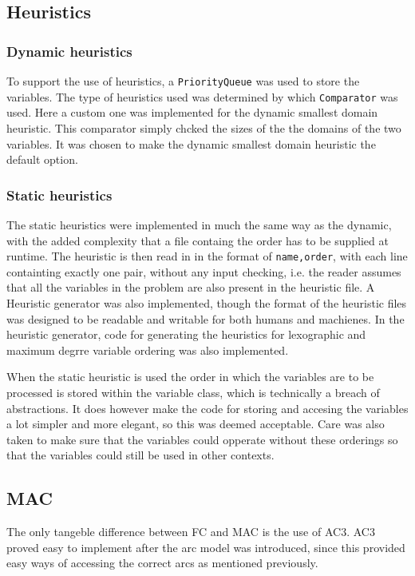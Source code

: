 \documentclass[british]{article}
\newcommand{\code}[1]{\texttt{#1}}
\begin{document}
\subsection{Heuristics}
\subsubsection{Dynamic heuristics}
To support the use of heuristics, a \code{PriorityQueue} was used to store the variables. The type of heuristics used was determined by which \code{Comparator}
 was used. Here a custom one was implemented for the dynamic smallest domain heuristic. This comparator simply chcked the sizes of the the domains of the two variables. It was chosen to make the dynamic smallest domain heuristic the default option. 
\subsubsection{Static heuristics} The static heuristics were implemented in much the same way as the dynamic, with the added complexity that a file containg the order has to be supplied at runtime. The heuristic is then read in in the format of \code{name,order}, with each line containting exactly one pair, without any input checking, i.e. the reader assumes that all the variables in the problem are also present in the heuristic file. A Heuristic generator was also implemented, though the format of the heuristic files was designed to be readable and writable for both humans and machienes. In the heuristic generator, code for generating the heuristics for lexographic and maximum degrre variable ordering was also implemented. 

When the static heuristic is used the order in which the variables are to be processed is stored within the variable class, which is technically a breach of abstractions. It does however make the code for storing and accesing the variables a lot simpler and more elegant, so this was deemed acceptable. Care was also taken to make sure that the variables could opperate without these orderings so that the variables could still be used in other contexts. 

\subsection{MAC}
The only tangeble difference  between FC and MAC is the use of AC3. AC3 proved easy to implement after the arc model was introduced, since this provided easy ways of accessing the correct arcs as mentioned previously. 
\end{document}
